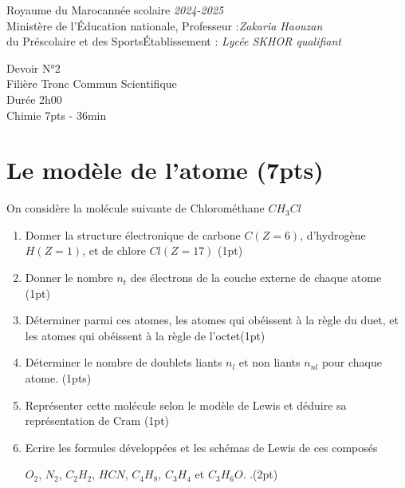 \documentclass[12pt]{article}
\newcommand\headerMe[2]{\noindent{}#1\hfill#2}
\begin{document}
\headerMe{Royaume du Maroc}{année scolaire \emph{2024-2025}}\\
\headerMe{Ministère de l'Éducation nationale, }{  Professeur :\emph{Zakaria Haouzan}}\\
\headerMe{du Préscolaire et des Sports}{Établissement : \emph{Lycée SKHOR qualifiant}}\\

\begin{center}

    \vspace{-1.5cm}
Devoir  N°2 \\
   Filière Tronc Commun Scientifique\\
Durée 2h00
\\
\hrulefill
\Large{Chimie 7pts - 36min}
\hrulefill\\

\end{center}
 
    \vspace{-1.2cm}
    
\section*{Le modèle de l'atome  \dotfill (7pts) }


On considère la molécule suivante de Chlorométhane $CH_3Cl$

\begin{enumerate}

\item Donner la structure électronique de carbone $C (Z=6)$, d’hydrogène $H (Z=1)$, et de chlore $Cl (Z=17)$ \dotfill(1pt)
\item  Donner le nombre $n_t$ des électrons de la couche externe de chaque atome \dotfill(1pt)
\item  Déterminer parmi ces atomes, les atomes qui obéissent à la règle du duet, et les atomes qui obéissent
à la règle de l’octet\dotfill(1pt)

\item   Déterminer le nombre de doublets liants $n_l$ et non liants $n_{nl}$ pour chaque atome. \dotfill(1pts)

\item  Représenter cette molécule selon le modèle de Lewis et déduire sa représentation de Cram \dotfill(1pt)

\item Ecrire les formules développées et les schémas de Lewis de ces composés

  $O_2$, $N_2$, $C_2H_2$, $HCN$, $C_4H_8$, $C_3H_4$ et $C_3H_6O$.
.\dotfill(2pt)
\end{enumerate}
\end{document}
